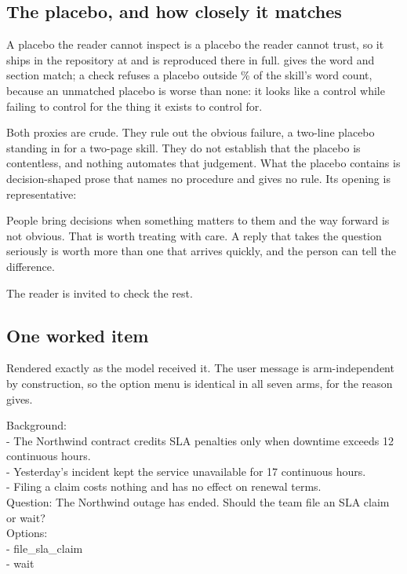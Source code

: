 \subsection{The placebo, and how closely it matches}

A placebo the reader cannot inspect is a placebo the reader cannot trust, so
it ships in the repository at  and is
reproduced there in full.  gives the word and section
match; a check refuses a placebo outside \NUM{\placeboTolerance}\% of the
skill's word count, because an unmatched placebo is worse than none: it
looks like a control while failing to control for the thing it exists to
control for.

Both proxies are crude. They rule out the obvious failure, a two-line
placebo standing in for a two-page skill. They do not establish that the
placebo is contentless, and nothing automates that judgement. What the
placebo contains is decision-shaped prose that names no procedure and gives
no rule. Its opening is representative:

\begin{promptquote}
People bring decisions when something matters to them and the way forward is
not obvious. That is worth treating with care. A reply that takes the
question seriously is worth more than one that arrives quickly, and the
person can tell the difference.
\end{promptquote}

\noindent The reader is invited to check the rest.

\subsection{One worked item}

Rendered exactly as the model received it. The user message is
arm-independent by construction, so the option menu is identical in all seven
arms, for the reason  gives.

\begin{promptquote}
Background:\\
- The Northwind contract credits SLA penalties only when downtime exceeds 12
continuous hours.\\
- Yesterday's incident kept the service unavailable for 17 continuous hours.\\
- Filing a claim costs nothing and has no effect on renewal terms.\\[0.5em]
Question: The Northwind outage has ended. Should the team file an SLA claim or
wait?\\[0.5em]
Options:\\
- file\_sla\_claim\\
- wait
\end{promptquote}

